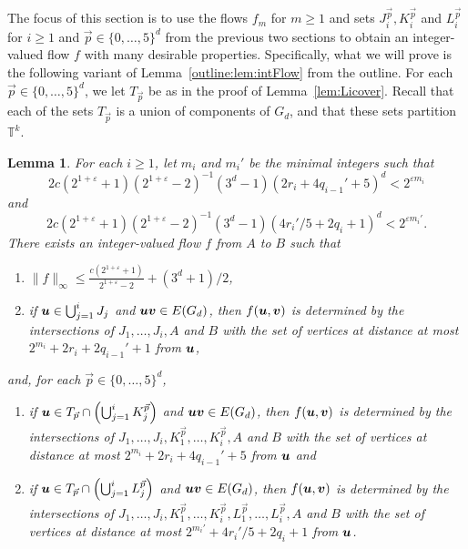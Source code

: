 \documentclass[12pt,a4paper]{amsart}
\numberwithin{equation}{section}
\newtheorem{lemma}[equation]{Lemma}
\theoremstyle{definition}
\begin{document}
The focus of this section is to use the flows $f_m$ for $m\geq1$ and sets $J_i^{\vec{p}}, K_i^{\vec{p}}$ and $L_i^{\vec{p}}$ for $i\geq1$ and $\vec{p}\in \{0,\dots,5\}^d$ from the previous two sections to obtain an integer-valued flow $f$ with many desirable properties. Specifically, what we will prove is the following variant of Lemma~\ref{outline:lem:intFlow} from the outline. For each $\vec{p}\in \{0,\dots,5\}^d$, we let $T_{\vec{p}}$ be as in the proof of Lemma~\ref{lem:Licover}. Recall that each of the sets $T_{\vec{p}}$ is a union of components of $G_d$, and that these sets partition $\mathbb{T}^k$. 

\begin{lemma}
\label{lem:intFlow}
For each $i\geq1$, let $m_i$ and $m_i'$ be the minimal integers such that
\begin{equation}
\label{eq:miDefAgain}
2c\left(2^{1+\varepsilon}+1\right)\left(2^{1+\varepsilon}-2\right)^{-1}(3^d-1) (2r_i+4q_{i-1}'+5)^d<2^{\varepsilon m_i}
\end{equation}
and
\begin{equation}
\label{eq:mi'Def}
2c\left(2^{1+\varepsilon}+1\right)\left(2^{1+\varepsilon}-2\right)^{-1}(3^d-1)(4r_i'/5 + 2q_i+1)^d<2^{\varepsilon m_i'}.
\end{equation}
There exists an integer-valued flow $f$ from $A$ to $B$ such that
\begin{enumerate}
\item\label{eq:fBounded} $\|f\|_\infty\leq \frac{c(2^{1+\varepsilon}+1)}{2^{1+\varepsilon}-2} + (3^d+1)/2$,
\item\label{eq:fLocalJ} if $\boldsymbol{u}\in \bigcup_{j=1}^iJ_j$ and $\boldsymbol{u}\boldsymbol{v}\in E(G_d)$, then $f(\boldsymbol{u},\boldsymbol{v})$ is determined by the intersections of $J_1,\dots,J_i,A$ and $B$ with the set of vertices at distance at most $2^{m_i}+2r_i+2q_{i-1}'+1$ from $\boldsymbol{u}$,
\end{enumerate}
and, for each $\vec{p}\in\{0,\dots,5\}^d$,
\begin{enumerate}
\item\label{eq:fLocalK} if $\boldsymbol{u}\in T_{\vec{p}}\cap\left(\bigcup_{j=1}^iK_j^{\vec{p}}\right)$ and $\boldsymbol{u}\boldsymbol{v}\in E(G_d)$, then $f(\boldsymbol{u},\boldsymbol{v})$ is determined by the intersections of $J_1,\dots,J_i,K_1^{\vec{p}},\dots,K_i^{\vec{p}},A$ and $B$ with the set of vertices at distance at most $2^{m_i}+2r_i+4q_{i-1}'+5$ from $\boldsymbol{u}$ and
\item\label{eq:fLocalL} if $\boldsymbol{u}\in T_{\vec{p}}\cap\left(\bigcup_{j=1}^iL_j^{\vec{p}}\right)$ and $\boldsymbol{u}\boldsymbol{v}\in E(G_d)$, then $f(\boldsymbol{u},\boldsymbol{v})$ is determined by the intersections of $J_1,\dots,J_i,K_1^{\vec{p}},\dots,K_i^{\vec{p}},L_1^{\vec{p}},\dots,L_i^{\vec{p}},A$ and $B$ with the set of vertices at distance at most $2^{m_i'}+4r_i'/5+2q_{i}+1$ from $\boldsymbol{u}$.
\end{enumerate}
\end{lemma}
\end{document}
